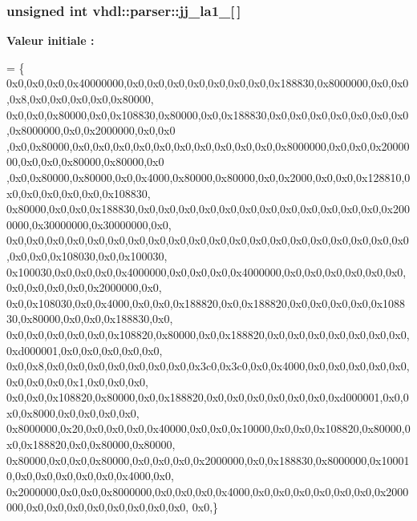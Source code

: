 \subsubsection[{jj\+\_\+la1\+\_\+3}]{\setlength{\rightskip}{0pt plus 5cm}unsigned int vhdl\+::parser\+::jj\+\_\+la1\+\_\mbox{[}$\,$\mbox{]}}\label{namespacevhdl_1_1parser_ab8a4cb3eb6e58082964968187e10d5cd}
{\bfseries Valeur initiale \+:}
\begin{DoxyCode}
= \{
0x0,0x0,0x0,0x40000000,0x0,0x0,0x0,0x0,0x0,0x0,0x0,0x188830,0x8000000,0x0,0x0,0x8,0x0,0x0,0x0,0x0,0x80000,
      0x0,0x0,0x80000,0x0,0x108830,0x80000,0x0,0x188830,0x0,0x0,0x0,0x0,0x0,0x0,0x0,0x8000000,0x0,0x2000000,0x0,0x0
      ,0x0,0x80000,0x0,0x0,0x0,0x0,0x0,0x0,0x0,0x0,0x0,0x0,0x8000000,0x0,0x0,0x2000000,0x0,0x0,0x80000,0x80000,0x0
      ,0x0,0x80000,0x80000,0x0,0x4000,0x80000,0x80000,0x0,0x2000,0x0,0x0,0x128810,0x0,0x0,0x0,0x0,0x0,0x108830,
      0x80000,0x0,0x0,0x188830,0x0,0x0,0x0,0x0,0x0,0x0,0x0,0x0,0x0,0x0,0x0,0x0,0x2000000,0x30000000,0x30000000,0x0,
      0x0,0x0,0x0,0x0,0x0,0x0,0x0,0x0,0x0,0x0,0x0,0x0,0x0,0x0,0x0,0x0,0x0,0x0,0x0,0x0,0x0,0x0,0x108030,0x0,0x100030,
      0x100030,0x0,0x0,0x0,0x4000000,0x0,0x0,0x0,0x4000000,0x0,0x0,0x0,0x0,0x0,0x0,0x0,0x0,0x0,0x0,0x2000000,0x0,
      0x0,0x108030,0x0,0x4000,0x0,0x0,0x188820,0x0,0x188820,0x0,0x0,0x0,0x0,0x108830,0x80000,0x0,0x0,0x188830,0x0,
      0x0,0x0,0x0,0x0,0x0,0x108820,0x80000,0x0,0x188820,0x0,0x0,0x0,0x0,0x0,0x0,0x0,0xd000001,0x0,0x0,0x0,0x0,0x0,
      0x0,0x8,0x0,0x0,0x0,0x0,0x0,0x0,0x0,0x3c0,0x3c0,0x0,0x4000,0x0,0x0,0x0,0x0,0x0,0x0,0x0,0x0,0x1,0x0,0x0,0x0,
      0x0,0x0,0x108820,0x80000,0x0,0x188820,0x0,0x0,0x0,0x0,0x0,0x0,0xd000001,0x0,0x0,0x8000,0x0,0x0,0x0,0x0,
      0x8000000,0x20,0x0,0x0,0x0,0x40000,0x0,0x0,0x10000,0x0,0x0,0x108820,0x80000,0x0,0x188820,0x0,0x80000,0x80000,
      0x80000,0x0,0x0,0x80000,0x0,0x0,0x0,0x2000000,0x0,0x188830,0x8000000,0x100010,0x0,0x0,0x0,0x0,0x0,0x4000,0x0,
      0x2000000,0x0,0x0,0x8000000,0x0,0x0,0x0,0x4000,0x0,0x0,0x0,0x0,0x0,0x0,0x2000000,0x0,0x0,0x0,0x0,0x0,0x0,0x0,0x0,
      0x0,\}
\end{DoxyCode}
\hypertarget{namespacevhdl_1_1parser_abf4cc2c3f20ef53df8d9f8d6c5998beb}{}
